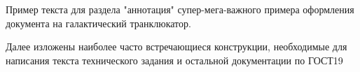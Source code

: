 \annotation

Пример текста для раздела "аннотация" супер-мега-важного примера оформления документа на галактический транклюкатор.

Далее изложены наиболее часто встречающиеся конструкции, необходимые для написания текста технического задания и остальной документации по ГОСТ19